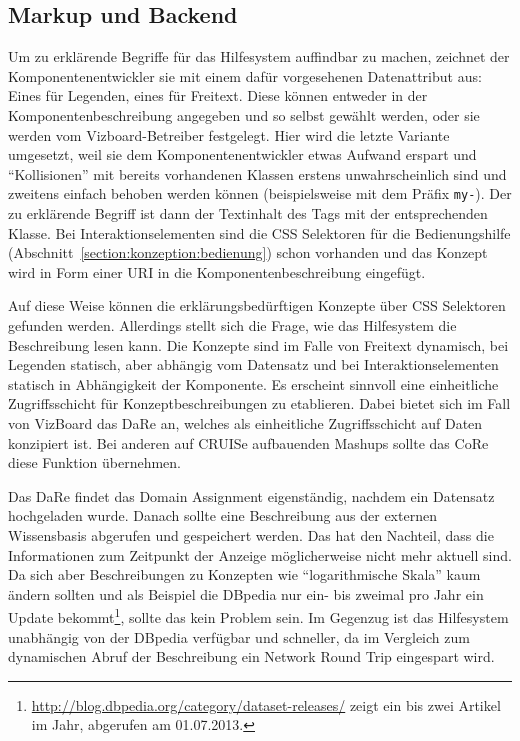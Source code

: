 \documentclass[
	headsepline,
	footsepline,
	fontsize=12pt,
	bibliography=totoc
]{scrbook}
\begin{document}
\subsection{Markup und Backend}
\label{section:konzeption:verlinkung:backend}

Um zu erklärende Begriffe für das Hilfesystem auffindbar zu machen, zeichnet der Komponentenentwickler sie mit einem dafür vorgesehenen Datenattribut aus: Eines für Legenden, eines für Freitext. Diese können entweder in der Komponentenbeschreibung angegeben und so selbst gewählt werden, oder sie werden vom Vizboard-Betreiber festgelegt. Hier wird die letzte Variante umgesetzt, weil sie dem Komponentenentwickler etwas Aufwand erspart und \enquote{Kollisionen} mit bereits vorhandenen Klassen erstens unwahrscheinlich sind und zweitens einfach behoben werden können (beispielsweise mit dem Präfix \texttt{my-}). Der zu erklärende Begriff ist dann der Textinhalt des Tags mit der entsprechenden Klasse. Bei Interaktionselementen sind die CSS Selektoren für die Bedienungshilfe (Abschnitt~\ref{section:konzeption:bedienung}) schon vorhanden und das Konzept wird in Form einer URI in die Komponentenbeschreibung eingefügt.

Auf diese Weise können die erklärungsbedürftigen Konzepte über CSS Selektoren gefunden werden. Allerdings stellt sich die Frage, wie das Hilfesystem die Beschreibung lesen kann. Die Konzepte sind im Falle von Freitext dynamisch, bei Legenden statisch, aber abhängig vom Datensatz und bei Interaktionselementen statisch in Abhängigkeit der Komponente. Es erscheint sinnvoll eine einheitliche Zugriffsschicht für Konzeptbeschreibungen zu etablieren. Dabei bietet sich im Fall von VizBoard das DaRe an, welches als einheitliche Zugriffsschicht auf Daten konzipiert ist. Bei anderen auf CRUISe aufbauenden Mashups sollte das CoRe diese Funktion übernehmen.

Das DaRe findet das Domain Assignment eigenständig, nachdem ein Datensatz hochgeladen wurde. Danach sollte eine Beschreibung aus der externen Wissensbasis abgerufen und gespeichert werden. Das hat den Nachteil, dass die Informationen zum Zeitpunkt der Anzeige möglicherweise nicht mehr aktuell sind. Da sich aber Beschreibungen zu Konzepten wie \enquote{logarithmische Skala} kaum ändern sollten und als Beispiel die DBpedia nur ein- bis zweimal pro Jahr ein Update bekommt\footnote{\url{http://blog.dbpedia.org/category/dataset-releases/} zeigt ein bis zwei Artikel im Jahr, abgerufen am 01.07.2013.}, sollte das kein Problem sein. Im Gegenzug ist das Hilfesystem unabhängig von der DBpedia verfügbar und schneller, da im Vergleich zum dynamischen Abruf der Beschreibung ein Network Round Trip eingespart wird.
\end{document}
